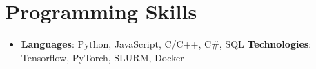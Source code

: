 \documentclass[letterpaper,11pt]{article}
\newcommand{\resumeSubHeadingListStart}{\begin{itemize}[leftmargin=*]}
\newcommand{\resumeSubHeadingListEnd}{\end{itemize}}
\begin{document}
%
\section{Programming Skills}
  \resumeSubHeadingListStart
    \item{
      \textbf{Languages}{: Python, JavaScript, C/C++, C\#, SQL}
      \hfill
      \textbf{Technologies}{: Tensorflow, PyTorch, SLURM, Docker}
    }
  \resumeSubHeadingListEnd


\end{document}
